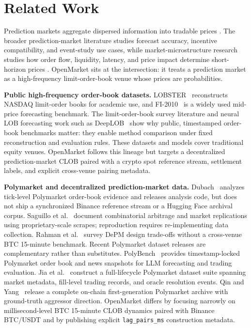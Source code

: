\section{Related Work}
\label{sec:related-work}

Prediction markets aggregate dispersed information into tradable prices
\cite{wolfers2004prediction,hanson2003combinatorial,berg2008prediction}.
The broader prediction-market literature studies forecast accuracy, incentive
compatibility, and event-study use cases, while market-microstructure research
studies how order flow, liquidity, latency, and price impact determine
short-horizon prices \cite{madhavan2000survey,ohara2015high,cont2014price}.
OpenMarket sits at the intersection: it treats a prediction market as a
high-frequency limit-order-book venue whose prices are probabilities.

\textbf{Public high-frequency order-book datasets.}
LOBSTER~\cite{huang2011lobster} reconstructs NASDAQ limit-order books for
academic use, and FI-2010~\cite{ntakaris2018benchmark} is a widely used
mid-price forecasting benchmark. The limit-order-book survey literature
\cite{gould2013limit} and neural LOB forecasting work such as
DeepLOB~\cite{zhang2019deeplob} show why public, timestamped order-book
benchmarks matter: they enable method comparison under fixed reconstruction and
evaluation rules. These datasets and models cover traditional equity venues.
OpenMarket follows this lineage but targets a decentralized prediction-market
CLOB paired with a crypto spot reference stream, settlement labels, and explicit
cross-venue pairing metadata.

\textbf{Polymarket and decentralized prediction-market data.}
Dubach~\cite{dubach2026anatomy} analyzes tick-level Polymarket order-book
evidence and releases analysis code, but does not ship a synchronized Binance
reference stream or a Hugging Face archival corpus. Saguillo et
al.~\cite{saguillo2025arbitrage} document combinatorial arbitrage and market
replications using proprietary-scale scrapes; reproduction requires
re-implementing data collection. Rahman et al.~\cite{rahman2025sok} survey DePM
design trade-offs without a cross-venue BTC 15-minute benchmark.
Recent Polymarket dataset releases are complementary rather than substitutes.
PolyBench~\cite{cheng2026polybench} provides timestamp-locked Polymarket order
book and news snapshots for LLM forecasting and trading evaluation. Jia et
al.~\cite{jia2026forecasting} construct a full-lifecycle Polymarket dataset
suite spanning market metadata, fill-level trading records, and oracle
resolution events. Qin and Yang~\cite{qin2026polymarketv1} release a complete
on-chain first-generation Polymarket archive with ground-truth aggressor
direction. OpenMarket differs by focusing narrowly on millisecond-level BTC
15-minute CLOB dynamics paired with Binance BTC/USDT and by publishing explicit
\texttt{lag\_pairs\_ms} construction metadata.

